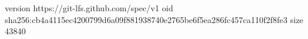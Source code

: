 version https://git-lfs.github.com/spec/v1
oid sha256:cb4a4115ec4200799d6a09f881938740e2765be6f5ea286fc457ca110f2f8fe3
size 43840
